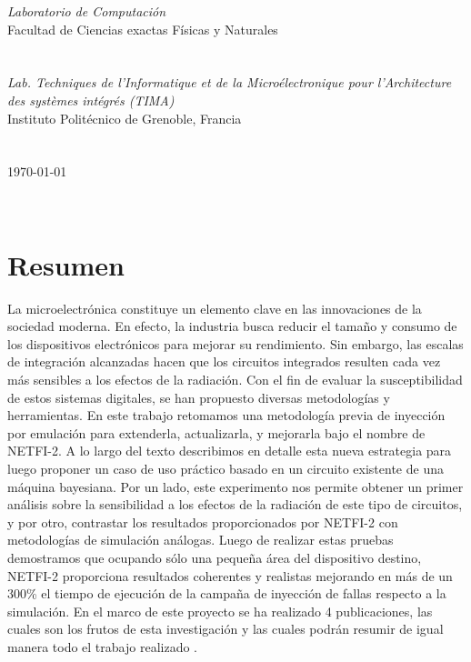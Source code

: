 \documentclass[a4paper,openright,12pt]{report}
\begin{document}
\begin{titlepage}
\begin{center}
\large \textit{Laboratorio de Computación}\\ Facultad de Ciencias exactas Físicas y Naturales
\large \textit{}\\
\large \textit{}\\
\large \textit{}\\
\large \textit{ Lab. Techniques de l'Informatique et de la Microélectronique pour l'Architecture des systèmes intégrés (TIMA)}\\ Instituto Politécnico de Grenoble, Francia
 \large \textit{}\\
  \large \textit{}\\
   \large \textit{}\\
{\large \today}\\[2cm] %
 
\vfill
\end{center}
\end{titlepage}


$\ $
\thispagestyle{empty} %
% 



\chapter*{Resumen} %
La microelectrónica constituye un elemento clave en las innovaciones de la sociedad moderna. En efecto, la industria busca reducir el tamaño y consumo de los dispositivos electrónicos para mejorar su rendimiento. Sin embargo, las escalas de integración alcanzadas hacen que los circuitos integrados resulten cada vez más sensibles a los efectos de la radiación. Con el fin de evaluar la susceptibilidad de estos sistemas digitales, se han propuesto diversas metodologías y herramientas. En este trabajo retomamos una metodología previa de inyección por emulación para extenderla, actualizarla, y mejorarla bajo el nombre de NETFI-2. A lo largo del texto describimos en detalle esta nueva estrategia para luego proponer un caso de uso práctico basado en un circuito existente de una máquina bayesiana. Por un lado, este experimento nos permite obtener un primer análisis sobre la sensibilidad a los efectos de la radiación de este tipo de circuitos, y por otro, contrastar los resultados proporcionados por NETFI-2 con metodologías de simulación análogas. Luego de realizar estas pruebas demostramos que ocupando sólo una pequeña área del dispositivo destino, NETFI-2 proporciona resultados coherentes y realistas mejorando en más de un 300\% el tiempo de ejecución de la campaña de inyección de fallas respecto a la simulación. En el marco de este proyecto se ha realizado 4 publicaciones, las cuales son los frutos de esta investigación y las cuales podrán resumir de igual manera todo el trabajo realizado \cite{SanLuis} \cite{Alemania} \cite{Alemania2} \cite{Bariloche}.
\end{document}
